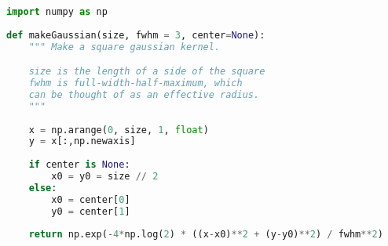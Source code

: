\begin{lstlisting}[language=Python]
import numpy as np
 
def makeGaussian(size, fwhm = 3, center=None):
    """ Make a square gaussian kernel.

    size is the length of a side of the square
    fwhm is full-width-half-maximum, which
    can be thought of as an effective radius.
    """
 
    x = np.arange(0, size, 1, float)
    y = x[:,np.newaxis]
    
    if center is None:
        x0 = y0 = size // 2
    else:
        x0 = center[0]
        y0 = center[1]
    
    return np.exp(-4*np.log(2) * ((x-x0)**2 + (y-y0)**2) / fwhm**2)

\end{lstlisting}
